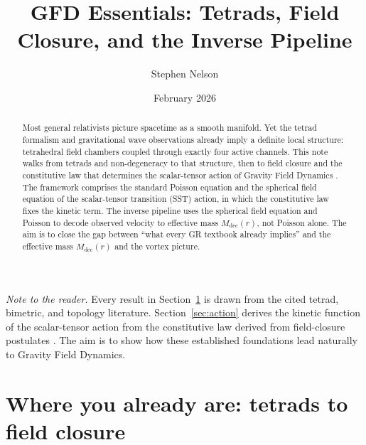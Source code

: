 \documentclass[aps,twocolumn,amsmath,amssymb,reprint,nofootinbib,nobalancelastpage]{revtex4-2}
\begin{document}
\title{GFD Essentials: Tetrads, Field Closure, and the Inverse Pipeline}

\author{Stephen Nelson}

\date{February 2026}

\begin{abstract}
Most general relativists picture spacetime as a smooth manifold. Yet the tetrad formalism and gravitational wave observations already imply a definite local structure: tetrahedral field chambers coupled through exactly four active channels. This note walks from tetrads and non-degeneracy to that structure, then to field closure and the constitutive law that determines the scalar-tensor action of Gravity Field Dynamics \cite{Nelson2026}. The framework comprises the standard Poisson equation and the spherical field equation of the scalar-tensor transition (SST) action, in which the constitutive law fixes the kinetic term. The inverse pipeline uses the spherical field equation and Poisson to decode observed velocity to effective mass $M_{\mathrm{dec}}(r)$, not Poisson alone. The aim is to close the gap between ``what every GR textbook already implies'' and the effective mass $M_{\mathrm{dec}}(r)$ and the vortex picture.
\end{abstract}

\maketitle

\emph{Note to the reader.} Every result in Section~\ref{sec:tetrads} is drawn from the cited tetrad, bimetric, and topology literature. Section~\ref{sec:action} derives the kinetic function of the scalar-tensor action from the constitutive law derived from field-closure postulates \cite{Nelson2026}. The aim is to show how these established foundations lead naturally to Gravity Field Dynamics.

\section{Where you already are: tetrads to field closure}
\label{sec:tetrads}
\end{document}
